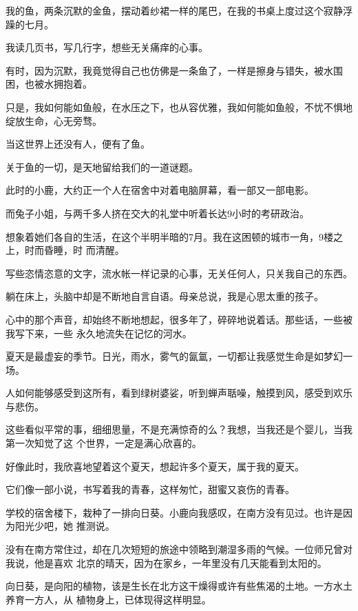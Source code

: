 \documentclass[12pt,a4paper]{article}
\def\blankrev{\vspace{1ex}}									%
\begin{document}
		\blankrev
		我的鱼，两条沉默的金鱼，摆动着纱裙一样的尾巴，在我的书桌上度过这个寂静浮躁的七月。\par
		我读几页书，写几行字，想些无关痛痒的心事。\par
		有时，因为沉默，我竟觉得自己也仿佛是一条鱼了，一样是擦身与错失，被水围困，也被水拥抱着。\par
		只是，我如何能如鱼般，在水压之下，也从容优雅，我如何能如鱼般，不忧不惧地绽放生命，心无旁骛。

		\blankrev
		当这世界上还没有人，便有了鱼。\par
		关于鱼的一切，是天地留给我们的一道谜题。

	\endwriting



		此时的小鹿，大约正一个人在宿舍中对着电脑屏幕，看一部又一部电影。

		而兔子小姐，与两千多人挤在交大的礼堂中听着长达9小时的考研政治。

		想象着她们各自的生活，在这个半明半暗的7月。我在这困顿的城市一角，9楼之上，时而昏睡，时
	而清醒。

		写些恣情恣意的文字，流水帐一样记录的心事，无关任何人，只关我自己的东西。

		躺在床上，头脑中却是不断地自言自语。母亲总说，我是心思太重的孩子。

		心中的那个声音，却始终不断地想起，很多年了，碎碎地说着话。那些话，一些被我写下来，一些
	永久地流失在记忆的河水。

		夏天是最虚妄的季节。日光，雨水，雾气的氤氲，一切都让我感觉生命是如梦幻一场。

		人如何能够感受到这所有，看到绿树婆娑，听到蝉声聒噪，触摸到风，感受到欢乐与悲伤。

		这些看似平常的事，细细思量，不是充满惊奇的么？我想，当我还是个婴儿，当我第一次知觉了这
	个世界，一定是满心欣喜的。

		好像此时，我欣喜地望着这个夏天，想起许多个夏天，属于我的夏天。

		它们像一部小说，书写着我的青春，这样匆忙，甜蜜又哀伤的青春。

		学校的宿舍楼下，栽种了一排向日葵。小鹿向我感叹，在南方没有见过。也许是因为阳光少吧，她
	推测说。

		没有在南方常住过，却在几次短短的旅途中领略到潮湿多雨的气候。一位师兄曾对我说，他是喜欢
	北京的晴天，因为在家乡，一年里没有几天能看到太阳的。

		向日葵，是向阳的植物，该是生长在北方这干燥得或许有些焦渴的土地。一方水土养育一方人，从
	植物身上，已体现得这样明显。
\end{document}
